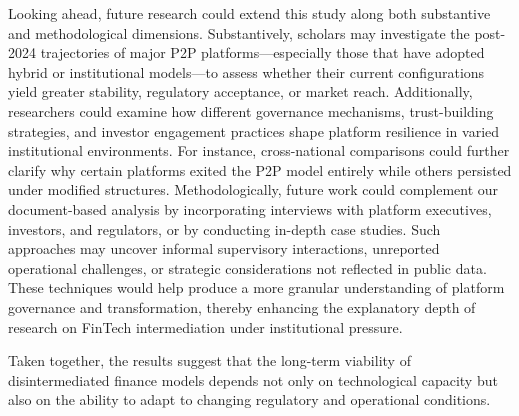\documentclass[pdflatex,sn-apa]{sn-jnl}%
\theoremstyle{thmstyleone}%
\theoremstyle{thmstyletwo}%
\theoremstyle{thmstylethree}%
\begin{document}
\textcolor{NavyBlue}{
Looking ahead, future research could extend this study along both substantive and methodological dimensions. Substantively, scholars may investigate the post-2024 trajectories of major P2P platforms—especially those that have adopted hybrid or institutional models—to assess whether their current configurations yield greater stability, regulatory acceptance, or market reach. Additionally, researchers could examine how different governance mechanisms, trust-building strategies, and investor engagement practices shape platform resilience in varied institutional environments. For instance, cross-national comparisons could further clarify why certain platforms exited the P2P model entirely while others persisted under modified structures. Methodologically, future work could complement our document-based analysis by incorporating interviews with platform executives, investors, and regulators, or by conducting in-depth case studies. Such approaches may uncover informal supervisory interactions, unreported operational challenges, or strategic considerations not reflected in public data. These techniques would help produce a more granular understanding of platform governance and transformation, thereby enhancing the explanatory depth of research on FinTech intermediation under institutional pressure.
}

Taken together, the results suggest that the long-term viability of disintermediated finance models depends not only on technological capacity but also on the ability to adapt to changing regulatory and operational conditions.

\newpage
\end{document}
